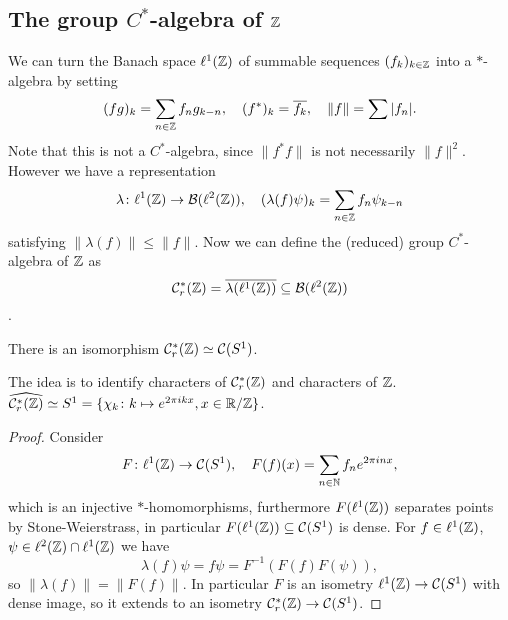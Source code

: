 \subsection{The group $C^\ast$-algebra of $\mathbb{Z}$}
We can turn the Banach space $\ell^1(\mathbb{Z})$ of summable sequences $(f_k)_{k\in\mathbb{Z}}$ into a $\ast$-algebra by setting $$(fg)_k=\sum_{n\in\mathbb{Z}}f_ng_{k-n},\quad (f^\ast)_k=\overline{f_k},\quad \|f\|=\sum|f_n|.$$ 
Note that this is not a $C^\ast$-algebra, since $\|f^\ast f\|$ is not necessarily $\|f\|^2$. However we have a representation $$\lambda\colon \ell^1(\mathbb{Z})\to\mathcal{B}(\ell^2(\mathbb{Z})),\quad (\lambda(f)\psi)_k=\sum_{n\in\mathbb{Z}}f_n\psi_{k-n}$$ satisfying $\|\lambda(f)\|\leq\|f\|$. Now we can define the (reduced) group $C^\ast$-algebra of $\mathbb{Z}$ as $$\mathcal{C}^\ast_r(\mathbb{Z})=\overline{\lambda(\ell^1(\mathbb{Z}))}\subseteq\mathcal{B}(\ell^2(\mathbb{Z}))$$.

\begin{proposition}
 There is an isomorphism $\mathcal{C}^\ast_r(\mathbb{Z})\simeq\mathcal{C}(S^1)$.
\end{proposition}

\noindent The idea is to identify characters of $\mathcal{C}^\ast_r(\mathbb{Z})$ and characters of $\mathbb{Z}$. $\widehat{\mathcal{C}^\ast_r(\mathbb{Z})}\simeq S^1=\{\chi_k\colon k\mapsto e^{2\pi ikx},x\in\mathbb{R}/\mathbb{Z}\}$.

\begin{proof}
 Consider $$F\colon\ell^1(\mathbb{Z})\to\mathcal{C}(S^1),\quad F(f)(x)=\sum_{n\in\mathbb{N}}f_ne^{2\pi inx},$$ which is an injective $\ast$-homomorphisms, furthermore $F(\ell^1(\mathbb{Z}))$ separates points by Stone-Weierstrass,  in particular $F(\ell^1(\mathbb{Z}))\subseteq\mathcal{C}(S^1)$ is dense. For $f\in\ell^1(\mathbb{Z})$,$\psi\in\ell^2(\mathbb{Z})\cap\ell^1(\mathbb{Z})$ we have $$\lambda(f)\psi=f\psi=F^{-1}(F(f)F(\psi)),$$ so $\|\lambda(f)\|=\|F(f)\|$. In particular $F$ is an isometry $\ell^1(\mathbb{Z})\to\mathcal{C}(S^1)$ with dense image, so it extends to an isometry $\mathcal{C}^\ast_r(\mathbb{Z})\to\mathcal{C}(S^1)$.
\end{proof}



